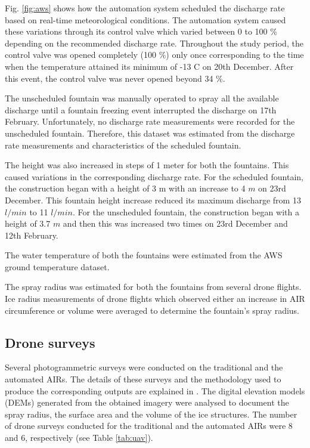 \documentclass[tc, manuscript]{copernicus}
\begin{document}
Fig. \ref{fig:aws} shows how the automation system scheduled the discharge rate based on real-time
meteorological conditions. The automation system caused these variations through its control valve which varied
between 0 to 100 \% depending on the recommended discharge rate. Throughout the study period, the control valve
was opened completely (100 \%) only once corresponding to the time when the temperature attained its minimum of
-13 \degree C on 20th December. After this event, the control valve was never opened beyond 34 \%.  

The unscheduled fountain was manually operated to spray all the available discharge until a fountain freezing
event interrupted the discharge on 17th February. Unfortunately, no discharge rate measurements were recorded
for the unscheduled fountain. Therefore, this dataset was estimated from the discharge rate measurements and
characteristics of the scheduled fountain.

The height was also increased in steps of 1 meter for both the fountains. This caused variations in the
corresponding discharge rate. For the scheduled fountain, the construction began with a height of 3 m with an
increase to 4 $m$ on 23rd December. This fountain height increase reduced its maximum discharge from
13 $l/min$ to 11 $l/min$. For the unscheduled fountain, the construction began with a height of 3.7 $m$ and then
this was increased two times on 23rd December and 12th February.  

The water temperature of both the fountains were estimated from the AWS ground temperature dataset.

The spray radius was estimated for both the fountains from several drone flights. Ice radius measurements of
drone flights which observed either an increase in AIR circumference or volume were averaged to determine the
fountain's spray radius.

\subsection{Drone surveys}

Several photogrammetric surveys were conducted on the traditional and the automated AIRs. The details of these
surveys and the methodology used to produce the corresponding outputs are explained in
\cite{balasubramanianInfluenceMeteorologicalConditions2022}. The digital elevation models (DEMs) generated from
the obtained imagery were analysed to document the spray radius, the surface area and the volume of the ice
structures.  The number of drone surveys conducted for the traditional and the automated AIRs were 8 and 6,
respectively (see Table \ref{tab:uav}). 
\end{document}
